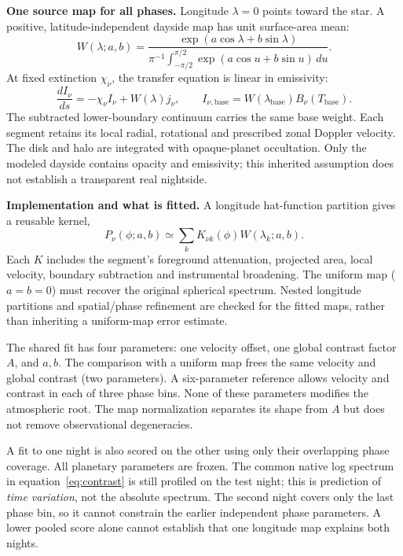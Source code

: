 \documentclass[10pt,a4paper]{article}
\begin{document}
\textbf{One source map for all phases.}
Longitude $\lambda=0$ points toward the star. A positive, latitude-independent
dayside map has unit surface-area mean:
\begin{equation}
W(\lambda;a,b)=\frac{\exp(a\cos\lambda+b\sin\lambda)}
 {\pi^{-1}\int_{-\pi/2}^{\pi/2}\exp(a\cos u+b\sin u)\,du}.
\label{eq:map}
\end{equation}
At fixed extinction $\chi_\nu$, the transfer equation is linear in emissivity:
\begin{equation}
\frac{dI_\nu}{ds}=-\chi_\nu I_\nu+W(\lambda)j_\nu,\qquad
I_{\nu,\mathrm{base}}=W(\lambda_{\mathrm{base}})B_\nu(T_{\mathrm{base}}).
\label{eq:transfer}
\end{equation}
The subtracted lower-boundary continuum carries the same base weight.
Each segment retains its local radial, rotational and prescribed zonal
Doppler velocity. The disk and halo are integrated with opaque-planet
occultation. Only the modeled dayside contains opacity and emissivity;
this inherited assumption does not establish a transparent real nightside.

\newpage
\textbf{Implementation and what is fitted.}
A longitude hat-function partition gives a reusable kernel,
\begin{equation}
P_\nu(\phi;a,b)\simeq\sum_k K_{\nu k}(\phi)W(\lambda_k;a,b).
\end{equation}
Each $K$ includes the segment's foreground attenuation, projected area,
local velocity, boundary subtraction and instrumental broadening.
The uniform map ($a=b=0$) must recover the original spherical spectrum.
Nested longitude partitions and spatial/phase refinement are checked for
the fitted maps, rather than inheriting a uniform-map error estimate.

The shared fit has four parameters: one velocity offset, one global contrast
factor $A$, and $a,b$. The comparison with a uniform map frees the same
velocity and global contrast (two parameters). A six-parameter reference
allows velocity and contrast in each of three phase bins. None of these
parameters modifies the atmospheric root. The map normalization separates
its shape from $A$ but does not remove observational degeneracies.

A fit to one night is also scored on the other using only their overlapping
phase coverage. All planetary parameters are frozen. The common native log
spectrum in equation~\eqref{eq:contrast} is still profiled on the test night;
this is prediction of \emph{time variation}, not the absolute spectrum.
The second night covers only the last phase bin, so it cannot constrain the
earlier independent phase parameters. A lower pooled score alone cannot
establish that one longitude map explains both nights.
\end{document}
